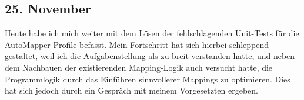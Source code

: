 \subsection{25. November}
Heute habe ich mich weiter mit dem Lösen der fehlschlagenden Unit-Tests für die AutoMapper Profile befasst. Mein Fortschritt hat sich hierbei schleppend gestaltet, weil ich die Aufgabenstellung als zu breit verstanden hatte, und neben dem Nachbauen der existierenden Mapping-Logik auch versucht hatte, die Programmlogik durch das Einführen sinnvollerer Mappings zu optimieren. Dies hat sich jedoch durch ein Gespräch mit meinem Vorgesetzten ergeben.